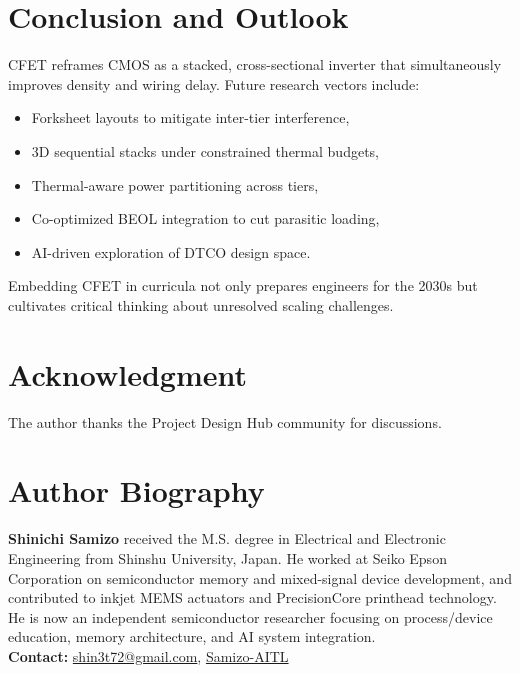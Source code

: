 \documentclass[conference]{IEEEtran}
\begin{document}
\section{Conclusion and Outlook}
CFET reframes CMOS as a stacked, cross-sectional inverter that simultaneously improves density and wiring delay.
Future research vectors include:
\begin{itemize}
  \item Forksheet layouts to mitigate inter-tier interference,
  \item 3D sequential stacks under constrained thermal budgets,
  \item Thermal-aware power partitioning across tiers,
  \item Co-optimized BEOL integration to cut parasitic loading,
  \item AI-driven exploration of DTCO design space.
\end{itemize}
Embedding CFET in curricula not only prepares engineers for the 2030s but cultivates critical thinking about unresolved scaling challenges.

\section*{Acknowledgment}
The author thanks the Project Design Hub community for discussions.




\section*{Author Biography}
\noindent\textbf{Shinichi Samizo}
received the M.S. degree in Electrical and Electronic Engineering from Shinshu University, Japan.
He worked at Seiko Epson Corporation on semiconductor memory and mixed-signal device development, and contributed to inkjet MEMS actuators and PrecisionCore printhead technology.
He is now an independent semiconductor researcher focusing on process/device education, memory architecture, and AI system integration.\\[2pt]
\textbf{Contact:} \href{mailto:shin3t72@gmail.com}{shin3t72@gmail.com}, \href{https://github.com/Samizo-AITL}{Samizo-AITL}
\end{document}
